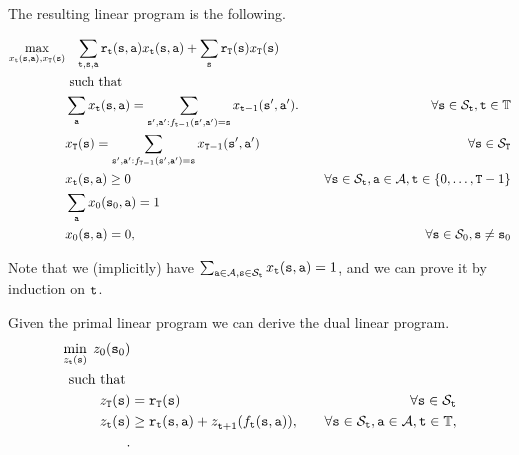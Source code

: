 \begin{leftbar}

The resulting linear program is the following.

\begin{align*}
\max_{x_{\tt t}({\tt s},{\tt a}),x_{{\tt T}}({\tt s})}&\;\;\;
\sum_{{\tt t},{\tt s},{\tt a}}
{\tt r}_{{\tt t}}({\tt s},{\tt a})x_{{\tt t}}({\tt s},{\tt a})+\sum_{{\tt s}}{\tt r}_{{\tt T}}({\tt s})x_{{\tt T}}({\tt s})\\
&\mbox{ such that }\\
&\sum_{{\tt a}}
x_{{\tt t}}({\tt s},{\tt a})=\sum_{{\tt s}',{\tt a}':f_{{\tt t}-1}({\tt s}',{\tt a}')={\tt s}}
x_{{\tt t}-1}({\tt s}',{\tt a}').
 &\quad\forall
{\tt s} \in {\mathcal{S}_{{\tt t}}},
{\tt t}\in\mathbb{T}\\
&x_{{\tt T}}({\tt s})=\sum_{{\tt s}',{\tt a}':f_{{\tt T}-1}({\tt s}',{\tt a}')={\tt s}}
x_{{\tt T}-1}({\tt s}',{\tt a}') &\quad\forall {\tt s} \in
{\mathcal{S}_{{\tt T}}}\\
&x_{{\tt t}}({\tt s},{\tt a}) \geq 0  &\quad\forall {\tt s} \in
{\mathcal{S}_{{\tt t}}}, {\tt a}\in\mathcal{A},
{\tt t}\in\{0,\ldots,{\tt T}-1\}\\
&\sum_{{\tt a}}x_{0}({\tt s}_0,{\tt a})=1\\
&x_{0}({\tt s},{\tt a})=0,  &\quad\forall {\tt s} \in {\mathcal{S}_{0}},
{\tt s}\neq {\tt s}_0\\
\end{align*}

Note that we (implicitly) have
$\sum_{{\tt a}\in\mathcal{A},{\tt s}\in\mathcal{S}_{{\tt t}}}
x_{{\tt t}}({\tt s},{\tt a})=1$, and we can prove it by induction on
${\tt t}$.

Given the primal linear program we can derive the dual linear
program.
\begin{align*}
\min_{z_{\tt t}({\tt s})}  \;z_0({\tt s}_0)&\\
\mbox{ such that }\\
z_{{\tt T}}({\tt s}) &= {\tt r}_{{\tt T}}({\tt s}) &\quad\forall
{\tt s} \in {\mathcal{S}_{{\tt t}}}\\
 z_{{\tt t}}({\tt s}) &\geq
{{{\tt r}_{{\tt t}}}({\tt s},{\tt a}) + z_{{\tt t}+
1}^{}({f_{{\tt t}}}({\tt s},{\tt a}))} , &\quad\forall {\tt s} \in
{\mathcal{S}_{{\tt t}}},{\tt a}\in\mathcal{A}, {\tt t}\in\mathbb{T},\\ .
\end{align*}


\end{leftbar}
